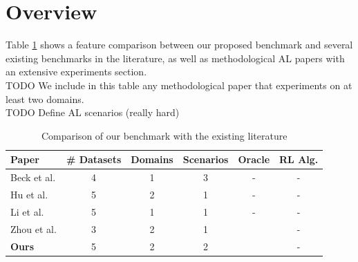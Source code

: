 \documentclass[]{article}
\begin{document}
\section{Overview}
Table \ref{tab:benchmark_comparison} shows a feature comparison between our proposed benchmark and several existing benchmarks in the literature, as well as methodological AL papers with an extensive experiments section. \\
{\color{red} TODO} We include in this table any methodological paper that experiments on at least two domains. \\
{\color{red} TODO} Define AL scenarios (really hard)
\begin{table}[h]
	\centering
	\begin{tabular}{l | c c c c c}
		Paper & \# Datasets & Domains & Scenarios & Oracle & RL Alg. \\
		\hline
		Beck et al. \cite{beck2021effective} & 4 & 1 & 3 & - & - \\
		Hu et al. \cite{hu2021towards} & 5 & 2 & 1 & - & - \\
		Li et al. \cite{li2022empirical} & 5 & 1 & 1 & - & - \\
		Zhou et al. \cite{zhou2021towards} & 3 & 2 & 1 & \checkmark & - \\
		\textbf{Ours} & 5 & 2 & 2 & \checkmark & -
	\end{tabular}
	\caption{Comparison of our benchmark with the existing literature}
	\label{tab:benchmark_comparison}
\end{table}



\end{document}
